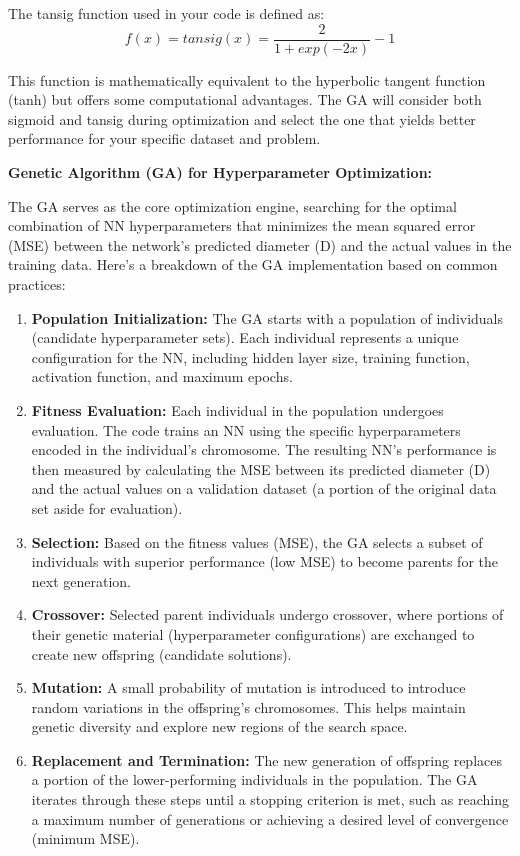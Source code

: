\documentclass[
  super,
  review,
  3p]{elsarticle}
\providecommand{\tightlist}{%
  \setlength{\itemsep}{0pt}\setlength{\parskip}{0pt}}\usepackage{longtable,booktabs,array}
\begin{document}
The tansig function used in your code is defined as: \[
f(x) = tansig(x) = \frac{2}{1 + exp(-2x)} - 1
\]

This function is mathematically equivalent to the hyperbolic tangent
function (tanh) but offers some computational advantages. The GA will
consider both sigmoid and tansig during optimization and select the one
that yields better performance for your specific dataset and problem.

\textbf{Genetic Algorithm (GA) for Hyperparameter Optimization:}

The GA serves as the core optimization engine, searching for the optimal
combination of NN hyperparameters that minimizes the mean squared error
(MSE) between the network's predicted diameter (D) and the actual values
in the training data. Here's a breakdown of the GA implementation based
on common practices:

\begin{enumerate}
\def\labelenumi{\arabic{enumi}.}
\tightlist
\item
  \textbf{Population Initialization:} The GA starts with a population of
  individuals (candidate hyperparameter sets). Each individual
  represents a unique configuration for the NN, including hidden layer
  size, training function, activation function, and maximum epochs.
\item
  \textbf{Fitness Evaluation:} Each individual in the population
  undergoes evaluation. The code trains an NN using the specific
  hyperparameters encoded in the individual's chromosome. The resulting
  NN's performance is then measured by calculating the MSE between its
  predicted diameter (D) and the actual values on a validation dataset
  (a portion of the original data set aside for evaluation).
\item
  \textbf{Selection:} Based on the fitness values (MSE), the GA selects
  a subset of individuals with superior performance (low MSE) to become
  parents for the next generation.
\item
  \textbf{Crossover:} Selected parent individuals undergo crossover,
  where portions of their genetic material (hyperparameter
  configurations) are exchanged to create new offspring (candidate
  solutions).
\item
  \textbf{Mutation:} A small probability of mutation is introduced to
  introduce random variations in the offspring's chromosomes. This helps
  maintain genetic diversity and explore new regions of the search
  space.
\item
  \textbf{Replacement and Termination:} The new generation of offspring
  replaces a portion of the lower-performing individuals in the
  population. The GA iterates through these steps until a stopping
  criterion is met, such as reaching a maximum number of generations or
  achieving a desired level of convergence (minimum MSE).
\end{enumerate}
\end{document}
